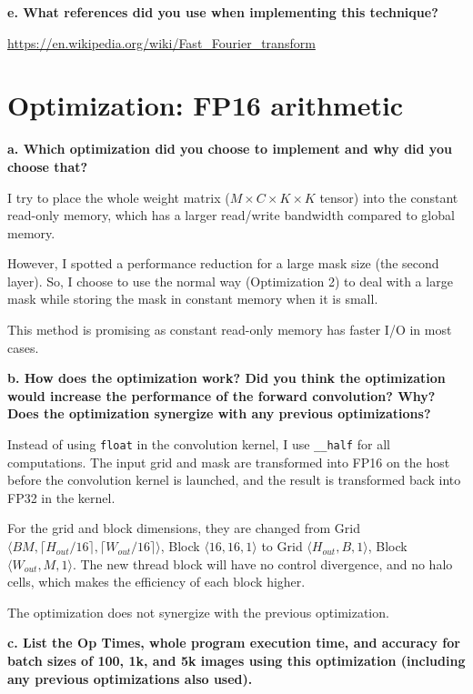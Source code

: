 \documentclass[12pt]{article}
\begin{document}
\hfill \break
\noindent \textbf{e. \; What references did you use when implementing this technique?}

\url{https://en.wikipedia.org/wiki/Fast_Fourier_transform}

\clearpage

\section{Optimization: FP16 arithmetic}

\hfill\break
\noindent \textbf{a. \; Which optimization did you choose to implement and why did you choose that?}
\hfill\break

I try to place the whole weight matrix ($M \times C \times K \times K$ tensor) into the constant read-only memory, which has a larger read/write bandwidth compared to global memory.

However, I spotted a performance reduction for a large mask size (the second layer). So, I choose to use the normal way (Optimization 2) to deal with a large mask while storing the mask in constant memory when it is small.

This method is promising as constant read-only memory has faster I/O in most cases.

\hfill \break
\noindent \textbf{b. \; How does the optimization work? Did you think the optimization would increase the performance of the forward convolution? Why? Does the optimization synergize with any previous optimizations?}
\hfill \break

Instead of using \texttt{float} in the convolution kernel, I use \texttt{\_\_half} for all computations. The input grid and mask are transformed into FP16 on the host before the convolution kernel is launched, and the result is transformed back into FP32 in the kernel.

For the grid and block dimensions, they are changed from Grid $\langle BM, \lceil H_{out} / 16 \rceil, \lceil W_{out} / 16 \rceil \rangle$, Block $\langle 16, 16, 1 \rangle$ to Grid $\langle H_{out}, B, 1 \rangle$, Block $\langle W_{out}, M, 1 \rangle$. The new thread block will have no control divergence, and no halo cells, which makes the efficiency of each block higher.

The optimization does not synergize with the previous optimization.

\hfill \break
\noindent \textbf{c. \; List the Op Times, whole program execution time, and accuracy for batch sizes of 100, 1k, and 5k images using this optimization (including any previous optimizations also used).}
\hfill \break
\end{document}
